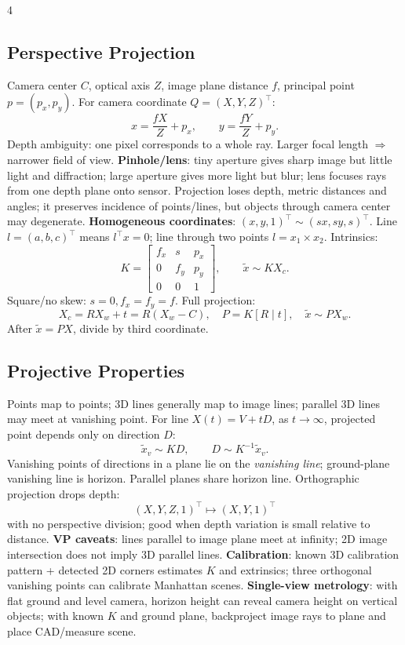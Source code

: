 \documentclass[8pt,a4paper,landscape]{extarticle}
\newcommand{\key}[1]{\textbf{#1}}
\newcommand{\term}[1]{\textit{#1}}
\begin{document}
\begin{multicols*}{4}
\subsection{Perspective Projection}
Camera center $C$, optical axis $Z$, image plane distance $f$, principal point $p=(p_x,p_y)$. For camera coordinate $Q=(X,Y,Z)^\top$:
\[
x=\frac{fX}{Z}+p_x,\qquad y=\frac{fY}{Z}+p_y .
\]
Depth ambiguity: one pixel corresponds to a whole ray. Larger focal length $\Rightarrow$ narrower field of view.
\key{Pinhole/lens}: tiny aperture gives sharp image but little light and diffraction; large aperture gives more light but blur; lens focuses rays from one depth plane onto sensor. Projection loses depth, metric distances and angles; it preserves incidence of points/lines, but objects through camera center may degenerate.
\key{Homogeneous coordinates}: $(x,y,1)^\top\sim(sx,sy,s)^\top$. Line $l=(a,b,c)^\top$ means $l^\top x=0$; line through two points $l=x_1\times x_2$. Intrinsics:
\[
K=\begin{bmatrix}f_x&s&p_x\\0&f_y&p_y\\0&0&1\end{bmatrix},\qquad
\tilde x\sim KX_c .
\]
Square/no skew: $s=0,f_x=f_y=f$. Full projection:
\[
X_c=RX_w+t=R(X_w-C),\quad P=K[R\mid t],\quad \tilde x\sim PX_w .
\]
After $\tilde x=PX$, divide by third coordinate.

\subsection{Projective Properties}
Points map to points; 3D lines generally map to image lines; parallel 3D lines may meet at vanishing point. For line $X(t)=V+tD$, as $t\to\infty$, projected point depends only on direction $D$:
\[
\tilde x_v\sim KD,\qquad D\sim K^{-1}\tilde x_v .
\]
Vanishing points of directions in a plane lie on the \term{vanishing line}; ground-plane vanishing line is horizon. Parallel planes share horizon line. Orthographic projection drops depth:
\[
(X,Y,Z,1)^\top\mapsto(X,Y,1)^\top
\]
with no perspective division; good when depth variation is small relative to distance.
\key{VP caveats}: lines parallel to image plane meet at infinity; 2D image intersection does not imply 3D parallel lines. \key{Calibration}: known 3D calibration pattern + detected 2D corners estimates $K$ and extrinsics; three orthogonal vanishing points can calibrate Manhattan scenes. \key{Single-view metrology}: with flat ground and level camera, horizon height can reveal camera height on vertical objects; with known $K$ and ground plane, backproject image rays to plane and place CAD/measure scene.


\end{multicols*}
\end{document}
